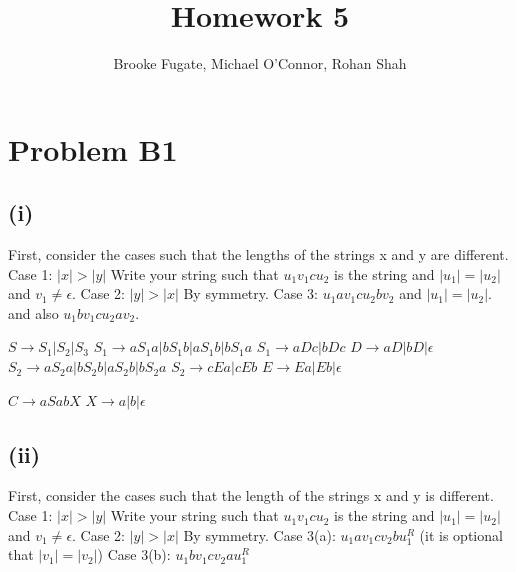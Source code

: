 \documentclass[12pt]{article}
\begin{document}
\pagestyle{plain}
\titleformat{\subsection}[runin]
  {\normalfont\large\bfseries}{\thesubsection}{1em}{}

\title{Homework 5}
\author{Brooke Fugate, Michael O'Connor, Rohan Shah}
\date{}

\maketitle

\section*{Problem B1}
\subsection*{(i)}

First, consider the cases such that the lengths of the strings x and y are different. \newline
Case 1: $|x| > |y|$ Write your string such that $u_1v_1cu_2$ is the string and $|u_1|=|u_2|$ and $v_1 \neq \epsilon$. \newline
Case 2: $|y| > |x|$ By symmetry. \newline
Case 3: $u_1av_1cu_2bv_2$ and $|u_1|=|u_2|$. and also $u_1bv_1cu_2av_2$.

\medskip 

$S \rightarrow S_1|S_2|S_3$ \newline
$S_1 \rightarrow aS_1a|bS_1b|aS_1b|bS_1a$ \newline
$S_1 \rightarrow aDc|bDc$ \newline
$D \rightarrow aD|bD| \epsilon$ \newline
$S_2 \rightarrow aS_2a|bS_2b|aS_2b|bS_2a$ \newline
$S_2 \rightarrow cEa|cEb$ \newline
$E \rightarrow Ea|Eb| \epsilon$ \newline

$C \rightarrow aSabX$ \newline
$X \rightarrow a|b|\epsilon$ \newline

\subsection*{(ii)}

First, consider the cases such that the length of the strings x and y is different. \newline
Case 1: $|x| > |y|$ Write your string such that $u_1v_1cu_2$ is the string and $|u_1|=|u_2|$ and $v_1 \neq \epsilon$. \newline
Case 2: $|y| > |x|$ By symmetry. \newline
Case 3(a): $u_1av_1cv_2bu_1^R$ (it is optional that $|v_1|=|v_2|$) \newline
Case 3(b): $u_1bv_1cv_2au_1^R$
\end{document}
